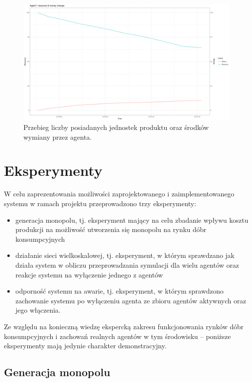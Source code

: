 \documentclass{article}
\begin{document}
\begin{figure}[H]
	\centering
	\includegraphics[width=\textwidth]{./png/analytics-image.png}
	\caption{Przebieg liczby posiadanych jednostek produktu oraz środków wymiany przez agenta.}
	\label{analytics-image}
\end{figure}

\section{Eksperymenty \label{sec3}}

W celu zaprezentowania możliwości zaprojektowanego i zaimplementowanego systemu w ramach projektu przeprowadzono trzy eksperymenty:

\begin{itemize}
	\item generacja monopolu, tj. eksperyment mający na celu zbadanie wpływu kosztu produkcji na możliwość utworzenia się monopolu na rynku dóbr konsumpcyjnych	
	\item działanie sieci wielkoskalowej, tj. eksperyment, w którym sprawdzano jak działa system w obliczu przeprowadzania symulacji dla wielu agentów oraz reakcje systemu na wyłączenie jednego z agentów
	\item odporność systemu na awarie, tj. eksperyment, w którym sprawdzono zachowanie systemu po wyłączeniu agenta ze zbioru agentów aktywnych oraz jego włączenia.
\end{itemize}


Ze względu na konieczną wiedzę ekspercką zakresu funkcjonowania rynków dóbr konsumpcyjnych i zachowań realnych agentów w tym środowisku -- 
poniższe eksperymenty mają jedynie charakter demonstracyjny.  

\subsection{Generacja monopolu}
\end{document}
